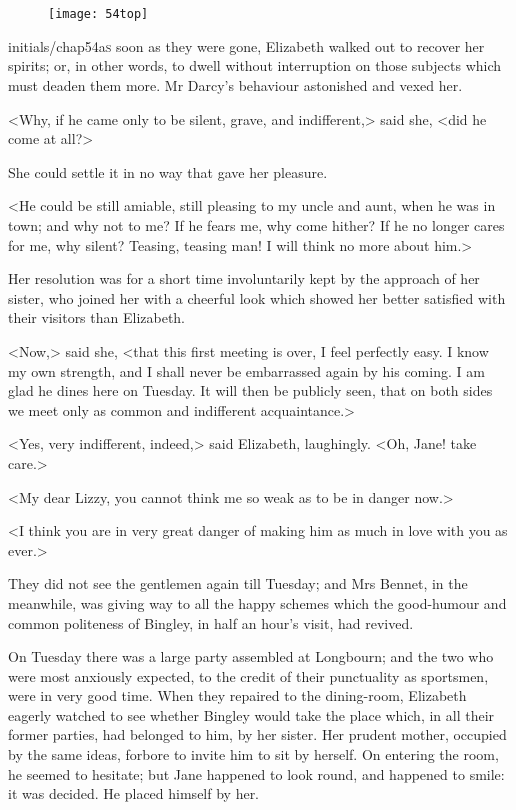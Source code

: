 \chapter[Chapter \thechapter]{}
	
	
\begin{figure}[t!]
\centering
\texttt{[image: 54top]}
\end{figure}


\lettrine[lines=6,image=true]{initials/chap54a}{s}  soon as they were gone, Elizabeth walked out to recover her spirits; or, in other words, to dwell without interruption on those subjects which must deaden them more. Mr Darcy's behaviour astonished and vexed her.

\zz
<Why, if he came only to be silent, grave, and indifferent,> said she, <did he come at all?>

She could settle it in no way that gave her pleasure.

<He could be still amiable, still pleasing to my uncle and aunt, when he was in town; and why not to me? If he fears me, why come hither? If he no longer cares for me, why silent? Teasing, teasing man! I will think no more about him.>

Her resolution was for a short time involuntarily kept by the approach of her sister, who joined her with a cheerful look which showed her better satisfied with their visitors than Elizabeth.

<Now,> said she, <that this first meeting is over, I feel perfectly easy. I know my own strength, and I shall never be embarrassed again by his coming. I am glad he dines here on Tuesday. It will then be publicly seen, that on both sides we meet only as common and indifferent acquaintance.>

<Yes, very indifferent, indeed,> said Elizabeth, laughingly. <Oh, Jane! take care.>

<My dear Lizzy, you cannot think me so weak as to be in danger now.>

<I think you are in very great danger of making him as much in love with you as ever.>

They did not see the gentlemen again till Tuesday; and Mrs Bennet, in the meanwhile, was giving way to all the happy schemes which the good-humour and common politeness of Bingley, in half an hour's visit, had revived.

On Tuesday there was a large party assembled at Longbourn; and the two who were most anxiously expected, to the credit of their punctuality as sportsmen, were in very good time. When they repaired to the dining-room, Elizabeth eagerly watched to see whether Bingley would take the place which, in all their former parties, had belonged to him, by her sister. Her prudent mother, occupied by the same ideas, forbore to invite him to sit by herself. On entering the room, he seemed to hesitate; but Jane happened to look round, and happened to smile: it was decided. He placed himself by her.

